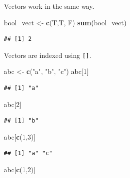 \documentclass[]{book}
\newenvironment{Shaded}{\begin{snugshade}}{\end{snugshade}}
\newcommand{\DecValTok}[1]{\textcolor[rgb]{0.00,0.00,0.81}{#1}}
\newcommand{\KeywordTok}[1]{\textcolor[rgb]{0.13,0.29,0.53}{\textbf{#1}}}
\newcommand{\NormalTok}[1]{#1}
\newcommand{\StringTok}[1]{\textcolor[rgb]{0.31,0.60,0.02}{#1}}
\begin{document}
Vectors work in the same way.

\begin{Shaded}
\begin{Highlighting}[]
\NormalTok{bool_vect <-}\StringTok{ }\KeywordTok{c}\NormalTok{(T,T, F)}
\KeywordTok{sum}\NormalTok{(bool_vect)}
\end{Highlighting}
\end{Shaded}

\begin{verbatim}
## [1] 2
\end{verbatim}

Vectors are indexed using \texttt{{[}{]}}.

\begin{Shaded}
\begin{Highlighting}[]
\NormalTok{abc <-}\StringTok{ }\KeywordTok{c}\NormalTok{(}\StringTok{"a"}\NormalTok{, }\StringTok{"b"}\NormalTok{, }\StringTok{"c"}\NormalTok{)}
\NormalTok{abc[}\DecValTok{1}\NormalTok{]}
\end{Highlighting}
\end{Shaded}

\begin{verbatim}
## [1] "a"
\end{verbatim}

\begin{Shaded}
\begin{Highlighting}[]
\NormalTok{abc[}\DecValTok{2}\NormalTok{]}
\end{Highlighting}
\end{Shaded}

\begin{verbatim}
## [1] "b"
\end{verbatim}

\begin{Shaded}
\begin{Highlighting}[]
\NormalTok{abc[}\KeywordTok{c}\NormalTok{(}\DecValTok{1}\NormalTok{,}\DecValTok{3}\NormalTok{)]}
\end{Highlighting}
\end{Shaded}

\begin{verbatim}
## [1] "a" "c"
\end{verbatim}

\begin{Shaded}
\begin{Highlighting}[]
\NormalTok{abc[}\KeywordTok{c}\NormalTok{(}\DecValTok{1}\NormalTok{,}\DecValTok{2}\NormalTok{)]}
\end{Highlighting}
\end{Shaded}
\end{document}
